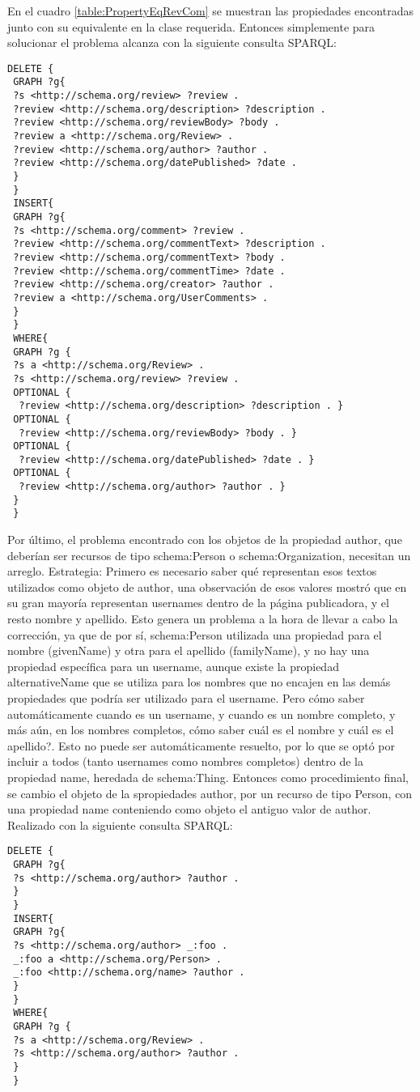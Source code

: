 En el cuadro \ref{table:PropertyEqRevCom} se muestran las propiedades encontradas junto con su equivalente en la clase requerida. 
Entonces simplemente para solucionar el problema alcanza con la siguiente consulta SPARQL:\\
\begin{lstlisting}[frame=single]
 DELETE { 
 GRAPH ?g{ 
 ?s <http://schema.org/review> ?review .
 ?review <http://schema.org/description> ?description .
 ?review <http://schema.org/reviewBody> ?body .
 ?review a <http://schema.org/Review> .
 ?review <http://schema.org/author> ?author . 
 ?review <http://schema.org/datePublished> ?date .
 } 
 } 
 INSERT{ 
 GRAPH ?g{ 
 ?s <http://schema.org/comment> ?review .
 ?review <http://schema.org/commentText> ?description .
 ?review <http://schema.org/commentText> ?body .
 ?review <http://schema.org/commentTime> ?date .
 ?review <http://schema.org/creator> ?author .
 ?review a <http://schema.org/UserComments> .
 }
 }
 WHERE{
 GRAPH ?g {
 ?s a <http://schema.org/Review> .
 ?s <http://schema.org/review> ?review .
 OPTIONAL {
  ?review <http://schema.org/description> ?description . }
 OPTIONAL {
  ?review <http://schema.org/reviewBody> ?body . }
 OPTIONAL {
  ?review <http://schema.org/datePublished> ?date . }
 OPTIONAL {
  ?review <http://schema.org/author> ?author . }
 }
 }
\end{lstlisting}

Por último, el problema encontrado con los objetos de la propiedad author, que deberían ser recursos de tipo schema:Person o schema:Organization, 
necesitan un arreglo.
Estrategia: 
Primero es necesario saber qué representan esos textos utilizados como objeto de author, una observación de esos valores mostró que 
en su gran mayoría representan usernames dentro de la página publicadora, y el resto nombre y apellido.
Esto genera un problema a la hora de llevar a cabo la corrección, ya que de por sí, schema:Person utilizada una propiedad para el nombre (givenName) 
y otra para el apellido (familyName), y no hay una propiedad específica para un username, aunque existe la propiedad alternativeName que 
se utiliza para los nombres que no encajen en las demás propiedades que podría ser utilizado para el username.
Pero cómo saber automáticamente cuando es un username, y cuando es un nombre completo, y más aún, en los nombres completos, cómo saber cuál es el nombre y 
cuál es el apellido?.
Esto no puede ser automáticamente resuelto, por lo que se optó por incluir a todos (tanto usernames como nombres completos) dentro de la propiedad name, heredada de 
schema:Thing.
Entonces como procedimiento final, se cambio el objeto de la spropiedades author, por un recurso de tipo Person, con una propiedad name conteniendo 
como objeto el antiguo valor de author. Realizado con la siguiente consulta SPARQL:\\
\begin{lstlisting}[frame=single]
 DELETE { 
 GRAPH ?g{ 
 ?s <http://schema.org/author> ?author .
 } 
 } 
 INSERT{ 
 GRAPH ?g{ 
 ?s <http://schema.org/author> _:foo .
 _:foo a <http://schema.org/Person> .
 _:foo <http://schema.org/name> ?author .
 }
 }
 WHERE{
 GRAPH ?g {
 ?s a <http://schema.org/Review> .
 ?s <http://schema.org/author> ?author .
 }
 }
\end{lstlisting}